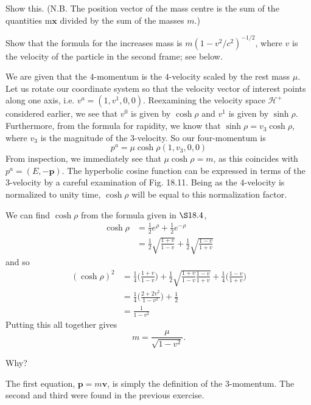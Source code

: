 \documentclass[../road-to-reality.tex]{subfiles}
\begin{document}
\begin{questions}
\question Show this. (N.B. The position vector of the mass centre is the sum of the quantities m$\mathbf{x}$ divided by the sum of the masses $m$.)

\question Show that the formula for the increases mass is $m(1 - v^2/c^2)^{-1/2}$, where $v$ is the velocity of the particle in the second frame; see below.

  \begin{solution}
    We are given that the $4$-momentum is the $4$-velocity scaled by the rest
    mass $\mu$. Let us rotate our coordinate system so that the velocity vector
    of interest points along one axis, i.e. $v^a = (1, v^1, 0, 0)$. Reexamining
    the velocity space $\mathcal{H}^+$ considered earlier, we see that $v^0$ is
    given by $\cosh\rho$ and $v^1$ is given by $\sinh\rho$. Furthermore, from
    the formula for rapidity, we know that $\sinh\rho=v_3\cosh\rho$, where $v_3$
    is the magnitude of the $3$-velocity. So our
    four-momentum is
    \[
      p^a = \mu\cosh\rho(1, v_3, 0, 0)
    \]
    From inspection, we immediately see that $\mu\cosh\rho = m$, as this
    coincides with $p^a=(E, -\mathbf{p})$. The hyperbolic cosine function can be
    expressed in terms of the $3$-velocity by a careful examination of Fig.
    18.11. Being as the $4$-velocity is normalized to unity time, $\cosh\rho$ will be
    equal to this normalization factor.

    We can find $\cosh\rho$ from the formula given in $\S18.4$,
    \begin{align*}
      \cosh\rho &= \frac{1}{2}e^{\rho} + \frac{1}{2}e^{-\rho} \\
                &= \frac{1}{2}\sqrt{\frac{1+v}{1-v}} + \frac{1}{2}\sqrt{\frac{1-v}{1+v}}
    \end{align*}
    and so
    \begin{align*}
      (\cosh\rho)^2 &= \frac{1}{4}\Big(\frac{1+v}{1-v}\Big) + \frac{1}{2}\sqrt{\frac{1+v}{1-v}\frac{1-v}{1+v}} + \frac{1}{4}\Big(\frac{1-v}{1+v}\Big) \\
                    &= \frac{1}{4}\Big(\frac{2+2v^2}{1-v^2}\Big) + \frac{1}{2}\\
                    &= \frac{1}{1-v^2}
    \end{align*}
    Putting this all together gives
    \[
      m = \frac{\mu}{\sqrt{1-v^2}}.
    \]
  \end{solution}

\question Why?

  \begin{solution}
    The first equation, $\mathbf{p} = m\mathbf{v}$, is simply the definition of
    the $3$-momentum. The second and third were found in the previous exercise.
  \end{solution}


\end{questions}
\end{document}
